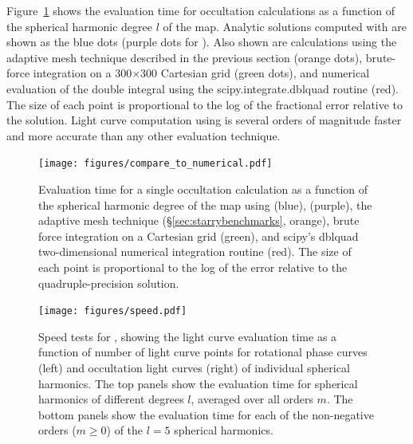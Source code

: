 \documentclass[modern]{aastex61}
\begin{document}
Figure~\ref{fig:compare_to_numerical} shows the evaluation time for
occultation calculations as a function of the spherical
harmonic degree $l$ of the map. Analytic solutions computed with \starry
are shown as the blue dots (purple dots for \starrygrad). Also shown are calculations using the adaptive
mesh technique described in the previous section (orange dots),
brute-force integration on a 300$\times$300 Cartesian grid (green dots),
and numerical evaluation of the double integral using the
\textsf{scipy.integrate.dblquad} \citep{scipy} routine (red). The size of each point
is proportional to the log of the fractional error relative to the
\starry solution. Light curve computation using \starry is several orders of
magnitude faster and more accurate than any other evaluation technique.

\begin{figure}[ht!]
    \begin{centering}
    \texttt{[image: figures/compare\_to\_numerical.pdf]}
    \caption{\label{fig:compare_to_numerical}
             Evaluation time for a single occultation calculation as a function
             of the spherical harmonic degree of the map using
             \starry (blue), \starrygrad (purple), the adaptive mesh technique (\S\ref{sec:starrybenchmarks}, orange),
             brute force integration on a Cartesian grid (green), and
             \textsf{scipy}'s \textsf{dblquad} two-dimensional numerical
             integration routine (red).
             The size of each point is proportional to the log of the error relative
             to the \starry quadruple-precision solution.
             }
    \end{centering}
\end{figure}

\begin{figure}[p!]
    \begin{centering}
    \texttt{[image: figures/speed.pdf]}
    \caption{\label{fig:speed}
             Speed tests for \starry, showing the light curve evaluation time
             as a function of number of light curve points for rotational
             phase curves (left) and occultation light curves (right) of individual
             spherical harmonics. The top
             panels show the evaluation time for spherical harmonics of different
             degrees $l$, averaged over all orders $m$. The bottom panels
             show the evaluation time for each of the non-negative orders ($m \ge 0$)
             of the $l = 5$ spherical harmonics.
             }
    \end{centering}
\end{figure}
\end{document}
